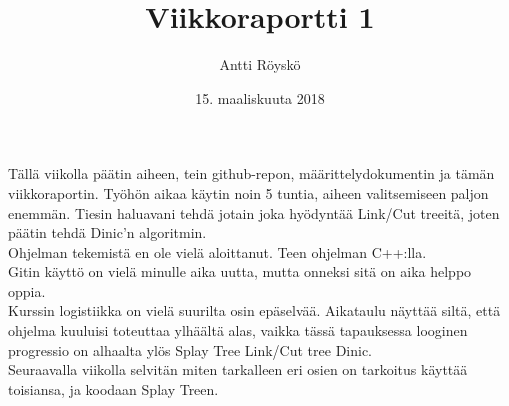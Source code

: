 \documentclass{article}
\title{Viikkoraportti 1}
\date{15. maaliskuuta 2018}
\author{Antti R\"oysk\"o}
\begin{document}
\maketitle

\noindent
T\"all\"a viikolla p\"a\"atin aiheen, tein github-repon, m\"a\"arittelydokumentin ja t\"am\"an viikkoraportin. Ty\"oh\"on aikaa k\"aytin noin 5 tuntia, aiheen valitsemiseen paljon enemm\"an. Tiesin haluavani tehd\"a jotain joka hy\"odynt\"a\"a Link/Cut treeit\"a, joten p\"a\"atin tehd\"a Dinic'n algoritmin.\\

\noindent
Ohjelman tekemist\"a en ole viel\"a aloittanut. Teen ohjelman C++:lla.\\

\noindent
Gitin k\"aytt\"o on viel\"a minulle aika uutta, mutta onneksi sit\"a on aika helppo oppia.\\

\noindent
Kurssin logistiikka on viel\"a suurilta osin ep\"aselv\"a\"a. Aikataulu n\"aytt\"a\"a silt\"a, ett\"a ohjelma kuuluisi toteuttaa ylh\"a\"alt\"a alas, vaikka t\"ass\"a tapauksessa looginen progressio on alhaalta yl\"os Splay Tree \rightarrow Link/Cut tree \rightarrow Dinic.\\

\noindent
Seuraavalla viikolla selvit\"an miten tarkalleen eri osien on tarkoitus k\"aytt\"a\"a toisiansa, ja koodaan Splay Treen.\\
\end{document}
